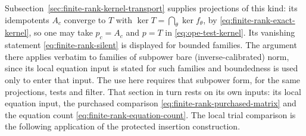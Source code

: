 Subsection~\ref{sec:finite-rank-kernel-transport} supplies projections of
this kind: its idempotents $A_c$ converge to $T$ with
$\ker T=\bigcap_\theta\ker f_\theta$, by
\eqref{eq:finite-rank-exact-kernel}, so one may take $p_c=A_c$ and
$p=T$ in \eqref{eq:ope-test-kernel}. Its vanishing statement
\eqref{eq:finite-rank-silent} is displayed for bounded families. The
argument there applies verbatim to families of subpower bare
(inverse-calibrated) norm, since its local equation input is stated for
such families and boundedness is used only to enter that input. The use
here requires that subpower form, for the same projections, tests and
filter. That section in turn rests on its own inputs: its local
equation input, the purchased comparison
\eqref{eq:finite-rank-purchased-matrix} and the equation count
\eqref{eq:finite-rank-equation-count}. The local trial comparison is the following application of the
protected insertion construction.


